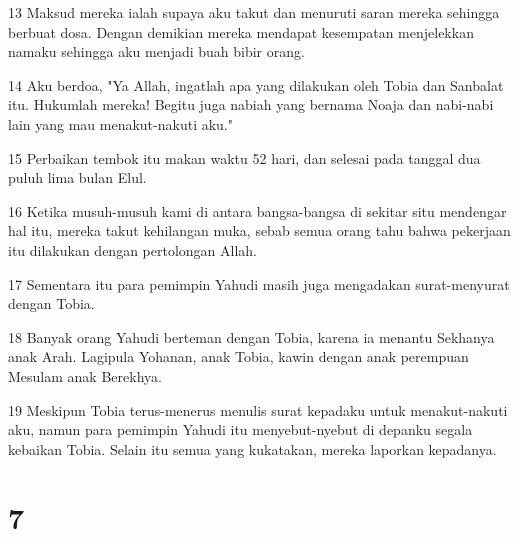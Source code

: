 \par 13 Maksud mereka ialah supaya aku takut dan menuruti saran mereka sehingga berbuat dosa. Dengan demikian mereka mendapat kesempatan menjelekkan namaku sehingga aku menjadi buah bibir orang.
\par 14 Aku berdoa, "Ya Allah, ingatlah apa yang dilakukan oleh Tobia dan Sanbalat itu. Hukumlah mereka! Begitu juga nabiah yang bernama Noaja dan nabi-nabi lain yang mau menakut-nakuti aku."
\par 15 Perbaikan tembok itu makan waktu 52 hari, dan selesai pada tanggal dua puluh lima bulan Elul.
\par 16 Ketika musuh-musuh kami di antara bangsa-bangsa di sekitar situ mendengar hal itu, mereka takut kehilangan muka, sebab semua orang tahu bahwa pekerjaan itu dilakukan dengan pertolongan Allah.
\par 17 Sementara itu para pemimpin Yahudi masih juga mengadakan surat-menyurat dengan Tobia.
\par 18 Banyak orang Yahudi berteman dengan Tobia, karena ia menantu Sekhanya anak Arah. Lagipula Yohanan, anak Tobia, kawin dengan anak perempuan Mesulam anak Berekhya.
\par 19 Meskipun Tobia terus-menerus menulis surat kepadaku untuk menakut-nakuti aku, namun para pemimpin Yahudi itu menyebut-nyebut di depanku segala kebaikan Tobia. Selain itu semua yang kukatakan, mereka laporkan kepadanya.

\chapter{7}

